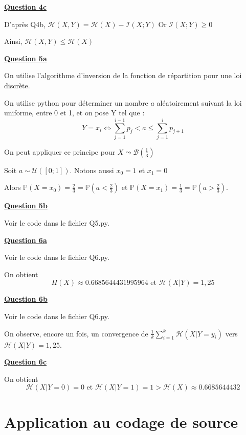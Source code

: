 \documentclass[a4paper,twoside,10pt]{article}
\renewcommand{\H}{\mathcal{H}}
\newcommand{\I}{\mathcal{I}}
\newcommand{\B}{\mathcal{B}}
\newenvironment{Q}[1]{%
\vspace{1ex}
\underline{\textbf{Question #1\\}}
\newline
}{
\vspace{2ex}
}
\begin{document}
\begin{Q}{4c}

D'après Q4b, $\H(X,Y) = \H(X) - \I(X;Y)$ Or $\I(X;Y) \geq 0$

Ainsi, $\H(X,Y) \leq \H(X)$
\end{Q}

\begin{Q}{5a}

On utilise l'algorithme d'inversion de la fonction de répartition pour une loi discrète.

On utilise python pour déterminer un nombre $a$ aléatoirement suivant la loi uniforme, entre 0 et 1, et on pose Y tel que : 
\[
Y = x_i  \iff \sum_{j = 1}^{i-1} p_j < a \leq \sum_{j = 1}^{i} p_{j+1}
\]

On peut appliquer ce principe pour $X \leadsto \B(\frac{1}{3})$

Soit $a \sim \mathcal{U}([0;1])$. Notons aussi $x_0 = 1$ et $x_1 = 0$

Alors $\mathbb{P}(X = x_0) = \frac{2}{3} = \mathbb{P}(a < \frac{2}{3})$ et 
$\mathbb{P}(X = x_1) = \frac{1}{3} = \mathbb{P}(a > \frac{2}{3})$.
\end{Q}

\begin{Q}{5b}
Voir le code dans le fichier Q5.py.
\end{Q}

\begin{Q}{6a}
Voir le code dans le fichier Q6.py.

On obtient \[H(X) \approx 0.6685644431995964 \text{ et } \H(X|Y) = 1,25\]
\end{Q}

\begin{Q}{6b}
Voir le code dans le fichier Q6.py.

On observe, encore un fois, un convergence de $\frac{1}{k} \sum_{i = 1}^{k} \H(X|Y = y_i)$ vers $\H(X|Y) = 1,25$.

\begin{center}
\end{center}

\end{Q}

\begin{Q}{6c}
On obtient \[\H(X|Y = 0) = 0 \text{ et } \H(X|Y = 1) = 1 > \H(X) \approx 0.6685644432 \]
\end{Q}

\section{Application au codage de source}
\end{document}
